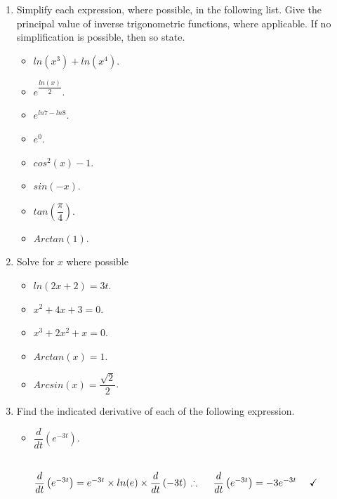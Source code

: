 \documentclass[fleqn]{article}
\begin{document}
  \begin{enumerate}
    \item Simplify each expression, where possible, in the following list. Give the
    principal value of inverse trigonometric functions, where applicable. If no
    simplification is possible, then so state.

    \begin{itemize}
      \item $ln (x^3)+ln (x^4)$.

      \item $e^{\dfrac{ln (x)}{2}}$.

      \item $e^{ln 7-ln 8}$.

      \item $e^0$.

      \item $cos^{2}(x)-1$.

      \item $sin(-x)$.

      \item $tan(\dfrac{\pi}{4})$.

      \item $Arctan(1)$.

    \end{itemize}


    \item Solve for $x$ where possible
    \begin{itemize}
      \item $ln(2x+2)=3t$.

      \item $x^2+4x+3=0$.

      \item $x^3+2x^2+x=0$.

      \item $Arctan (x)=1$.

      \item $Arcsin (x)=\dfrac{\sqrt{2}}{2}$.

    \end{itemize}

    \item Find the indicated derivative of each of the following expression.
    \begin{itemize}
      \item $\dfrac{d}{dt} \left(e^{-3t}\right)$.

        \textcolor{hwColor}{
          \\
          $
            \dfrac{d}{dt} \left(e^{-3t}\right)=e^{-3t} \times ln(e) \times \dfrac{d}{dt} \left(-3t\right)
            \\
            \\
            \\
            \therefore ~~~~ \dfrac{d}{dt} \left(e^{-3t}\right)=-3e^{-3t} ~~~~ \checkmark
            \\
          $
        }


\end{itemize}
\end{enumerate}
\end{document}
